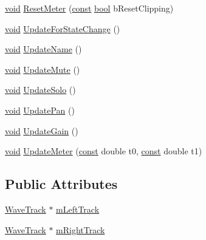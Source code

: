 \begin{DoxyCompactItemize}
\hyperlink{sound_8c_ae35f5844602719cf66324f4de2a658b3}{void} \hyperlink{class_mixer_track_cluster_a6ee897b910edd878eb6421b460e834d6}{Reset\+Meter} (\hyperlink{getopt1_8c_a2c212835823e3c54a8ab6d95c652660e}{const} \hyperlink{mac_2config_2i386_2lib-src_2libsoxr_2soxr-config_8h_abb452686968e48b67397da5f97445f5b}{bool} b\+Reset\+Clipping)
\item 
\hyperlink{sound_8c_ae35f5844602719cf66324f4de2a658b3}{void} \hyperlink{class_mixer_track_cluster_a451471fefb6f7cc5e2631ed3fcd6be68}{Update\+For\+State\+Change} ()
\item 
\hyperlink{sound_8c_ae35f5844602719cf66324f4de2a658b3}{void} \hyperlink{class_mixer_track_cluster_a28a7140ddbadb6e7ae682154ec047bb3}{Update\+Name} ()
\item 
\hyperlink{sound_8c_ae35f5844602719cf66324f4de2a658b3}{void} \hyperlink{class_mixer_track_cluster_ae7e14b27e6e8daf8230586b7d9061e1d}{Update\+Mute} ()
\item 
\hyperlink{sound_8c_ae35f5844602719cf66324f4de2a658b3}{void} \hyperlink{class_mixer_track_cluster_ab70aab06e6de51a697b6ebdd8b874b0f}{Update\+Solo} ()
\item 
\hyperlink{sound_8c_ae35f5844602719cf66324f4de2a658b3}{void} \hyperlink{class_mixer_track_cluster_aea6f953aeba5268cc5dcb1e75264c645}{Update\+Pan} ()
\item 
\hyperlink{sound_8c_ae35f5844602719cf66324f4de2a658b3}{void} \hyperlink{class_mixer_track_cluster_ad44e54662318d39e14c24f6cb2bd8aa6}{Update\+Gain} ()
\item 
\hyperlink{sound_8c_ae35f5844602719cf66324f4de2a658b3}{void} \hyperlink{class_mixer_track_cluster_a94fcfcb03f9125c9342ae35abe83f7f4}{Update\+Meter} (\hyperlink{getopt1_8c_a2c212835823e3c54a8ab6d95c652660e}{const} double t0, \hyperlink{getopt1_8c_a2c212835823e3c54a8ab6d95c652660e}{const} double t1)
\end{DoxyCompactItemize}
\subsection*{Public Attributes}
\begin{DoxyCompactItemize}
\item 
\hyperlink{class_wave_track}{Wave\+Track} $\ast$ \hyperlink{class_mixer_track_cluster_abe505e46feb71633bc88e0e09c04dc58}{m\+Left\+Track}
\item 
\hyperlink{class_wave_track}{Wave\+Track} $\ast$ \hyperlink{class_mixer_track_cluster_a6279b6c2cb20fd60bf85b5aa6e6a48ee}{m\+Right\+Track}
\end{DoxyCompactItemize}


